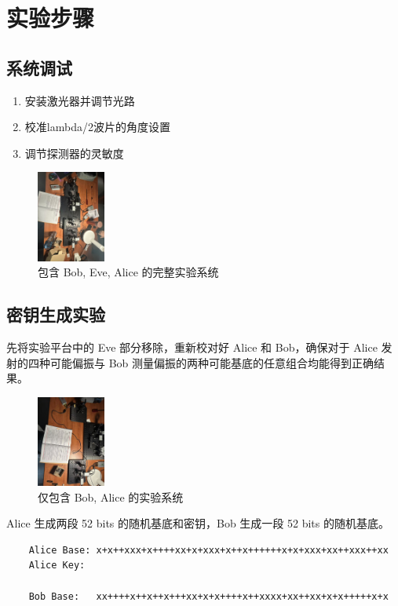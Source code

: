 \documentclass{ctexart}
\begin{document}
\section{实验步骤}
\subsection{系统调试}
\begin{enumerate}
\item 安装激光器并调节光路
\item 校准lambda/2波片的角度设置
\item 调节探测器的灵敏度
\end{enumerate}

\begin{figure}[htbp]
    \centering
    \includegraphics[width=0.2\textwidth,height=0.3\textwidth]{pictures/微信图片_20241031162855.jpg}
    \caption{包含 Bob, Eve, Alice 的完整实验系统}
\end{figure}

\subsection{密钥生成实验}
先将实验平台中的 Eve 部分移除，重新校对好 Alice 和 Bob，确保对于 Alice 发射的四种可能偏振与 Bob 测量偏振的两种可能基底的任意组合均能得到正确结果。

\begin{figure}[htbp]
    \centering
    \includegraphics[width=0.2\textwidth,height=0.3\textwidth]{pictures/微信图片_20241031162758.jpg}
    \caption{仅包含 Bob, Alice 的实验系统}
\end{figure}

Alice 生成两段 52 bits 的随机基底和密钥，Bob 生成一段 52 bits 的随机基底。
\begin{lstlisting}
    Alice Base: x+x++xxx+x++++xx+x+xxx+x++x++++++x+x+xxx+xx++xxx++xx
    Alice Key:  
    
    Bob Base:   xx++++x++x++x+++xx+x+x++++x++xxxx+xx++xx+x+x+++++x+x
\end{lstlisting}
\end{document}

